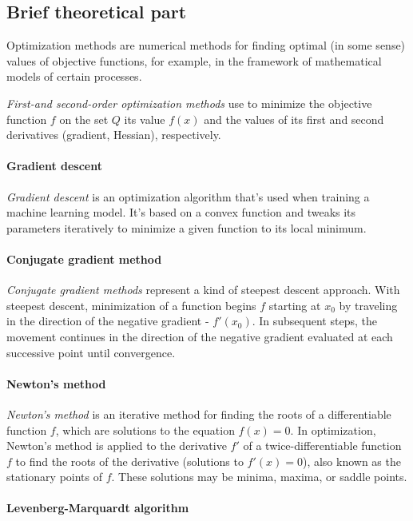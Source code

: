 \subsection{Brief theoretical part}\label{subsec:brief-theoretical-part}

Optimization methods are numerical methods for finding optimal (in some sense) values of objective functions, for example, in the framework of mathematical models of certain processes.

\textit{First-and second-order optimization methods} use to minimize the objective function $f$ on the set $Q$ its value $f(x)$ and the values of its first and second derivatives (gradient, Hessian), respectively.

\paragraph{Gradient descent}

\textit{Gradient descent} is an optimization algorithm that's used when training a machine learning model.
It's based on a convex function and tweaks its parameters iteratively to minimize a given function to its local minimum.

\paragraph{Conjugate gradient method}

\textit{Conjugate gradient methods} represent a kind of steepest descent approach.
With steepest descent, minimization of a function begins $f$ starting at $x_0$ by traveling in the direction of the negative gradient - $f'(x_0)$.
In subsequent steps, the movement continues in the direction of the negative gradient evaluated at each successive point until convergence.

\paragraph{Newton's method}

\textit{Newton's method} is an iterative method for finding the roots of a differentiable function $f$, which are solutions to the equation $f(x) = 0$.
In optimization, Newton's method is applied to the derivative $f'$ of a twice-differentiable function $f$ to find the roots of the derivative (solutions to $f'(x) = 0$), also known as the stationary points of $f$.
These solutions may be minima, maxima, or saddle points.

\paragraph{Levenberg-Marquardt algorithm}

